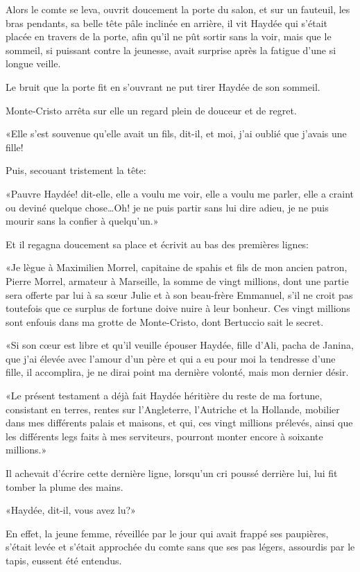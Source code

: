 Alors le comte se leva, ouvrit doucement la porte du salon, et sur un fauteuil, les bras pendants, sa belle tête pâle inclinée en arrière, il vit Haydée qui s'était placée en travers de la porte, afin qu'il ne pût sortir sans la voir, mais que le sommeil, si puissant contre la jeunesse, avait surprise après la fatigue d'une si longue veille. 

Le bruit que la porte fit en s'ouvrant ne put tirer Haydée de son sommeil. 

Monte-Cristo arrêta sur elle un regard plein de douceur et de regret. 

«Elle s'est souvenue qu'elle avait un fils, dit-il, et moi, j'ai oublié que j'avais une fille! 

Puis, secouant tristement la tête: 

«Pauvre Haydée! dit-elle, elle a voulu me voir, elle a voulu me parler, elle a craint ou deviné quelque chose\dots Oh! je ne puis partir sans lui dire adieu, je ne puis mourir sans la confier à quelqu'un.» 

Et il regagna doucement sa place et écrivit au bas des premières lignes: 

«Je lègue à Maximilien Morrel, capitaine de spahis et fils de mon ancien patron, Pierre Morrel, armateur à Marseille, la somme de vingt millions, dont une partie sera offerte par lui à sa sœur Julie et à son beau-frère Emmanuel, s'il ne croit pas toutefois que ce surplus de fortune doive nuire à leur bonheur. Ces vingt millions sont enfouis dans ma grotte de Monte-Cristo, dont Bertuccio sait le secret. 

«Si son cœur est libre et qu'il veuille épouser Haydée, fille d'Ali, pacha de Janina, que j'ai élevée avec l'amour d'un père et qui a eu pour moi la tendresse d'une fille, il accomplira, je ne dirai point ma dernière volonté, mais mon dernier désir. 

«Le présent testament a déjà fait Haydée héritière du reste de ma fortune, consistant en terres, rentes sur l'Angleterre, l'Autriche et la Hollande, mobilier dans mes différents palais et maisons, et qui, ces vingt millions prélevés, ainsi que les différents legs faits à mes serviteurs, pourront monter encore à soixante millions.» 

Il achevait d'écrire cette dernière ligne, lorsqu'un cri poussé derrière lui, lui fit tomber la plume des mains. 

«Haydée, dit-il, vous avez lu?» 

En effet, la jeune femme, réveillée par le jour qui avait frappé ses paupières, s'était levée et s'était approchée du comte sans que ses pas légers, assourdis par le tapis, eussent été entendus. 

